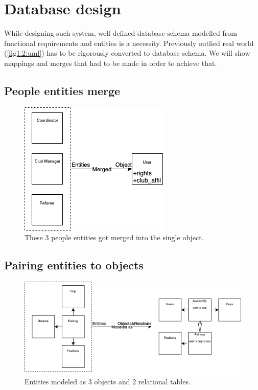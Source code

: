 \section{Database design}
While designing such system, well defined database schema modelled from functional requirements and entities is a necessity. Previously outlied real world (\autoref{fig1.2:uml}) has to be rigorously converted to database schema. We will show mappings and merges that had to be made in order to achieve that.
\subsection*{People entities merge}
\begin{figure}[h]	
	\centering	
    \includegraphics[scale=0.5]{img/entities_to_user.png}
	\caption{These 3 people entities got merged into the single object.}
	\label{fig2.6:enttousr}
\end{figure}
\subsection*{Pairing entities to objects}
\begin{figure}[h]	
	\centering	
    \includegraphics[scale=0.5]{img/entities_pairing_to_obj_rels.png}
	\caption{Entities modeled as 3 objects and 2 relational tables.}
	\label{fig2.7:entrels}
\end{figure}
